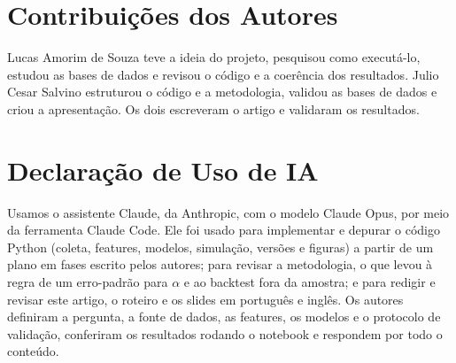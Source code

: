 \documentclass[conference]{IEEEtran}
\begin{document}
\section*{Contribuições dos Autores}
Lucas Amorim de Souza teve a ideia do projeto, pesquisou como executá-lo, estudou as bases de dados e revisou o código e a coerência dos resultados. Julio Cesar Salvino estruturou o código e a metodologia, validou as bases de dados e criou a apresentação. Os dois escreveram o artigo e validaram os resultados.

\section*{Declaração de Uso de IA}
Usamos o assistente Claude, da Anthropic, com o modelo Claude Opus, por meio da ferramenta Claude Code. Ele foi usado para implementar e depurar o código Python (coleta, features, modelos, simulação, versões e figuras) a partir de um plano em fases escrito pelos autores; para revisar a metodologia, o que levou à regra de um erro-padrão para $\alpha$ e ao backtest fora da amostra; e para redigir e revisar este artigo, o roteiro e os slides em português e inglês. Os autores definiram a pergunta, a fonte de dados, as features, os modelos e o protocolo de validação, conferiram os resultados rodando o notebook e respondem por todo o conteúdo.
\end{document}
